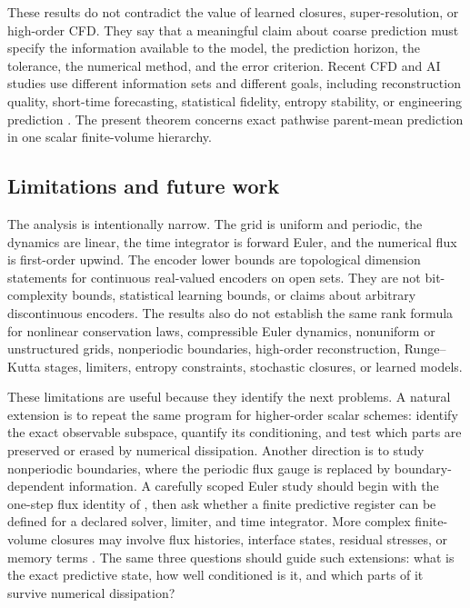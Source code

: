 \documentclass[preprint,12pt]{elsarticle}
\theoremstyle{plain}
\theoremstyle{remark}
\theoremstyle{definition}
\begin{document}
These results do not contradict the value of learned closures, super-resolution, or high-order CFD.  They say that a meaningful claim about
coarse prediction must specify the information available to the model, the
prediction horizon, the tolerance, the numerical method, and the error
criterion.  Recent CFD and AI studies use different information sets and
different goals, including reconstruction quality, short-time forecasting, statistical fidelity, entropy stability, or engineering prediction
\cite{Sofos:2025spatiotemporal,
Liu:2026entropyCFN,Charles:2025dspweno}.  The present theorem concerns exact
pathwise parent-mean prediction in one scalar finite-volume hierarchy.

\subsection{Limitations and future work}
\label{sec:limitations}

The analysis is intentionally narrow.  The grid is uniform and periodic, the
dynamics are linear, the time integrator is forward Euler, and the numerical
flux is first-order upwind.  The encoder lower bounds are topological
dimension statements for continuous real-valued encoders on open sets.  They
are not bit-complexity bounds, statistical learning bounds, or claims about
arbitrary discontinuous encoders.  The results also do not establish the same
rank formula for nonlinear conservation laws, compressible Euler dynamics,
nonuniform or unstructured grids, nonperiodic boundaries, high-order
reconstruction, Runge--Kutta stages, limiters, entropy constraints, stochastic
closures, or learned models.

These limitations are useful because they identify the next problems.  A
natural extension is to repeat the same program for higher-order scalar
schemes: identify the exact observable subspace, quantify its conditioning,
and test which parts are preserved or erased by numerical dissipation.
Another direction is to study nonperiodic boundaries, where the periodic flux
gauge is replaced by boundary-dependent information.  A carefully scoped
Euler study should begin with the one-step flux identity of
, then ask whether a finite predictive register can
be defined for a declared solver, limiter, and time integrator.  More complex
finite-volume closures may involve flux histories, interface states,
residual stresses, or memory terms
\cite{ChorinHaldKupferman:2002memory,ParishDuraisamy:2017nonmarkovian,
Agdestein:2026exactfvclosure}.  The same three questions should guide such
extensions: what is the exact predictive state, how well conditioned is it,
and which parts of it survive numerical dissipation?
\end{document}
